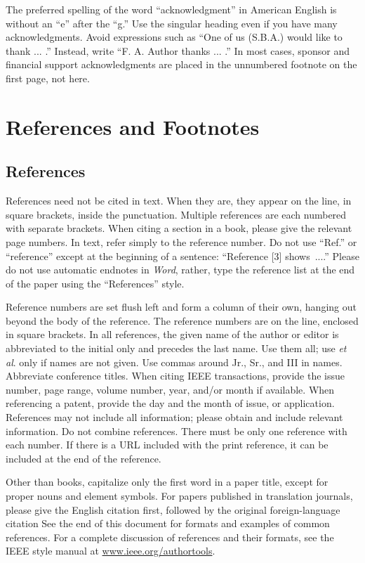 \documentclass[journal]{IEEEtai}
\begin{document}
The preferred spelling of the word ``acknowledgment'' in American English is without an ``e'' after the ``g.'' Use the singular heading even if you have many acknowledgments. Avoid expressions such as ``One of us (S.B.A.) would like to thank ... .'' Instead, write ``F. A. Author thanks ... .'' In most cases, sponsor and financial support acknowledgments are placed in the unnumbered footnote on the first page, not here.

\section*{References and Footnotes}

\subsection{References}

References need not be cited in text. When they are, they appear on the line, in square brackets, inside the punctuation. Multiple references are each numbered with separate brackets. When citing a section in a book, please give the relevant page numbers. In text, refer simply to the reference number. Do not use ``Ref.'' or ``reference'' except at the beginning of a sentence: ``Reference [3] shows~....'' Please do not use automatic endnotes in {\it Word}, rather, type the reference list at the end of the paper using the ``References''  style.

Reference numbers are set flush left and form a column of their own, hanging out beyond the body of the reference. The reference numbers are on the line, enclosed in square brackets. In all references, the given name of the author or editor is abbreviated to the initial only and precedes the last name. Use them all; use {\it et al}. only if names are not given. Use commas around Jr., Sr., and III in names. Abbreviate conference titles. When citing IEEE transactions, provide the issue number, page range, volume number, year, and/or month if available. When referencing a patent, provide the day and the month of issue, or application. References may not include all information; please obtain and include relevant information. Do not combine references. There must be only one reference with each number. If there is a URL included with the print reference, it can be included at the end of the reference. 

Other than books, capitalize only the first word in a paper title, except for proper nouns and element symbols. For papers published in translation journals, please give the English citation first, followed by the original foreign-language citation See the end of this document for formats and examples of common references. For a complete discussion of references and their formats, see the IEEE style manual at \underline{www.ieee.org/authortools}.
\end{document}

